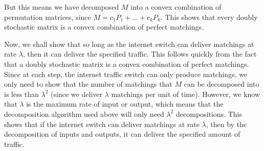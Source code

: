 \documentclass[psamsfonts]{amsart}
\newenvironment{sol}{\vspace{0.25cm}{\large \bfseries Solution:}}{\qedsymbol}
\begin{document}
\begin{sol}
But this means we have decomposed $M$ into a convex combination of permutation matrices, since $M = c_1 P_1 + \ldots + c_k P_k$. This shows that every doubly stochastic matrix is a convex combination of perfect matchings.

Now, we shall show that so long as the internet switch can deliver matchings at rate $\lambda$, then it can deliver the specified traffic. This follows quickly from the fact that a doubly stochastic matrix is a convex combination of perfect matchings. Since at each step, the internet traffic switch can only produce matchings, we only need to show that the number of matchings that $M$ can be decomposed into is less than $\lambda^2$ (since we deliver $\lambda$ matchings per unit of time). However, we know that $\lambda$ is the maximum rate of input or output, which means that the decomposition algorithm used above will only need $\lambda^2$ decompositions. This shows that if the internet switch can deliver matchings at rate $\lambda$, then by the decomposition of inputs and outputs, it can deliver the specified amount of traffic.
\end{sol}
\end{document}

